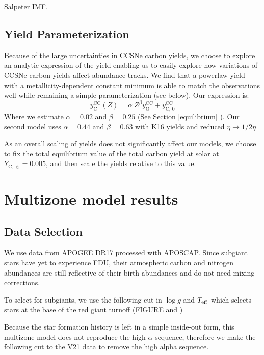 \documentclass[fleqn,usenatbib]{mnras}
\begin{document}
Salpeter IMF.

\subsection{Yield Parameterization}
  Because of the large uncertainties in CCSNe carbon yields, we choose to explore an analytic expression of the yield enabling us to easily explore how variations of CCSNe carbon yields affect abundance tracks. We find that a powerlaw yield with a metallicity-dependent constant minimum is able to match the observations well while remaining a simple parameterization (see below). Our expression is:
    \begin{equation}
   y_\text{C}^\text{CC}(Z) =  \alpha\ Z^\beta y_\text{O}^\text{CC} + y_\text{C, 0}^\text{CC}
    \end{equation}
   	Where we estimate $\alpha = 0.02$ and $\beta = 0.25$ (See Section \ref{equilibrium} ). Our second model uses $\alpha = 0.44$ and $\beta = 0.63$ with K16 yields and reduced $\eta \rightarrow 1/2 \eta$ 
    
    As an overall scaling of yields does not significantly affect our models, we choose to fix the total equilibrium value of the total carbon yield at solar at $Y_{\text{C},\ \sun} = 0.005$, and then scale the yields relative to this value. 

\section{Multizone model results}


\subsection{Data Selection}

We use data from APOGEE DR17 processed with APOSCAP. Since subgiant stars have yet to experience FDU, their atmospheric carbon and nitrogen abundances are still reflective of their birth abundances and do not need mixing corrections. 

To select for subgiants, we use the following cut in $\log g$ and $T_{\rm eff}$ which selects stars at the base of the red giant turnoff (FIGURE and \cite{jack_subgiant})

Because the star formation history is left in a simple inside-out form, this multizone model does not reproduce the high-$\alpha$ sequence, therefore we make the following cut to the V21 data to remove the high alpha sequence.
\end{document}
